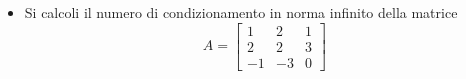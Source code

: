 \begin{itemize}
\item Si calcoli il numero di condizionamento in norma infinito della
matrice
\bigskip
\[
A=\left[
\begin{array}{ccc}
1 & 2 & 1 \\
2 & 2 & 3\\
-1 & -3 & 0
\end{array}\right]
\]
\end{itemize}
